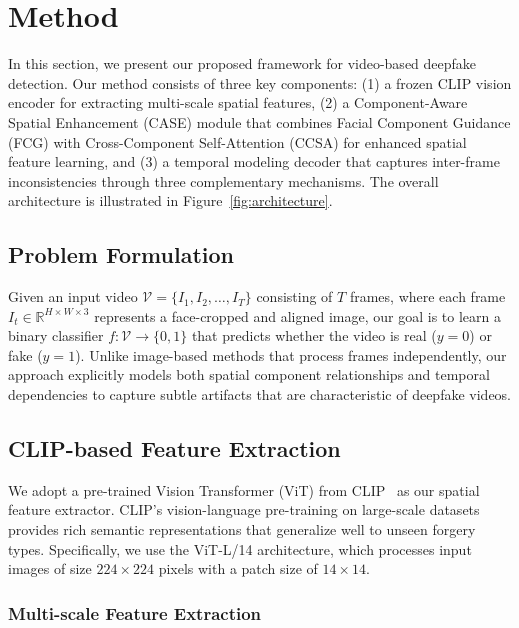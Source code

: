 \section{Method}
\label{sec:method}

In this section, we present our proposed framework for video-based deepfake detection. Our method consists of three key components: (1) a frozen CLIP vision encoder for extracting multi-scale spatial features, (2) a Component-Aware Spatial Enhancement (CASE) module that combines Facial Component Guidance (FCG) with Cross-Component Self-Attention (CCSA) for enhanced spatial feature learning, and (3) a temporal modeling decoder that captures inter-frame inconsistencies through three complementary mechanisms. The overall architecture is illustrated in Figure~\ref{fig:architecture}.

\subsection{Problem Formulation}

Given an input video $\mathcal{V} = \{I_1, I_2, \ldots, I_T\}$ consisting of $T$ frames, where each frame $I_t \in \mathbb{R}^{H \times W \times 3}$ represents a face-cropped and aligned image, our goal is to learn a binary classifier $f: \mathcal{V} \rightarrow \{0, 1\}$ that predicts whether the video is real ($y=0$) or fake ($y=1$). Unlike image-based methods that process frames independently, our approach explicitly models both spatial component relationships and temporal dependencies to capture subtle artifacts that are characteristic of deepfake videos.

\subsection{CLIP-based Feature Extraction}

We adopt a pre-trained Vision Transformer (ViT) from CLIP~\cite{radford2021learning} as our spatial feature extractor. CLIP's vision-language pre-training on large-scale datasets provides rich semantic representations that generalize well to unseen forgery types. Specifically, we use the ViT-L/14 architecture, which processes input images of size $224 \times 224$ pixels with a patch size of $14 \times 14$.

\subsubsection{Multi-scale Feature Extraction}

